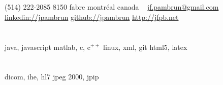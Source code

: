 \documentclass[print]{friggeri-cv}
\begin{document}

\newcommand{\eletr}{\href{http://www.etsmtl.ca/Programmes-Etudes/1er-cycle/Fiche-de-cours?Sigle=ELE747}{ele{\footnotesize747}}}
\newcommand{\eleenv}{\href{http://www.etsmtl.ca/Programmes-Etudes/1er-cycle/Fiche-de-cours?Sigle=ELE116}{ele{\footnotesize116}}}
\newcommand{\gtssys}{\href{http://www.etsmtl.ca/Futurs-etudiants/Cycles-sup/Fiche-de-cours?Sigle=GTS840}{gts{\footnotesize840}}}

\begin{aside}
  \section{}
  {\small(514) 222-2085}
  {\small8150} fabre
  montréal
  canada
  ~
  \href{mailto:jf.pambrun@gmail.com}{jf.pambrun@gmail.com}
  \href{https://ca.linkedin.com/in/jpambrun}{linkedin://jpambrun}
  \href{http://github.com/jpambrun}{github://jpambrun}
  \href{http://jfpb.net}{http://jfpb.net}
  \section{}
  \section{}
  java, javascript
  matlab, c, c{\tiny$^{++}$}
  linux, xml, git
  html{\small5}, latex
  \section{}
  dicom, ihe, hl{\small7}
  jpeg {\small2000}, jpip
\end{aside}

\begin{cvfootnote}
\end{cvfootnote}
\end{document}
